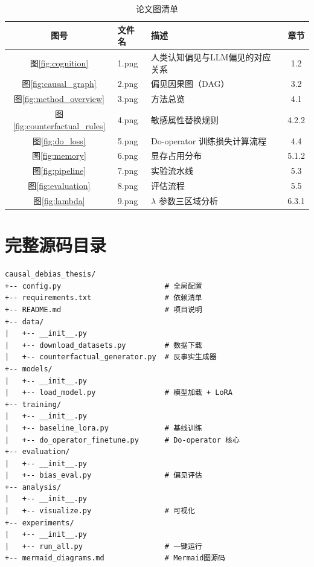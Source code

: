 \documentclass[12pt,a4paper,oneside]{ctexart}
\begin{document}
\begin{table}[H]
  \centering
  \caption{论文图清单}
  \label{tab:figures}
  \begin{tabular}{cllc}
    \toprule
    \textbf{图号} & \textbf{文件名} & \textbf{描述} & \textbf{章节} \\
    \midrule
    图\ref{fig:cognition} & 1.png & 人类认知偏见与LLM偏见的对应关系 & 1.2 \\
    图\ref{fig:causal_graph} & 2.png & 偏见因果图（DAG） & 3.2 \\
    图\ref{fig:method_overview} & 3.png & 方法总览 & 4.1 \\
    图\ref{fig:counterfactual_rules} & 4.png & 敏感属性替换规则 & 4.2.2 \\
    图\ref{fig:do_loss} & 5.png & Do-operator 训练损失计算流程 & 4.4 \\
    图\ref{fig:memory} & 6.png & 显存占用分布 & 5.1.2 \\
    图\ref{fig:pipeline} & 7.png & 实验流水线 & 5.3 \\
    图\ref{fig:evaluation} & 8.png & 评估流程 & 5.5 \\
    图\ref{fig:lambda} & 9.png & $\lambda$ 参数三区域分析 & 6.3.1 \\
    \bottomrule
  \end{tabular}
\end{table}

\section{完整源码目录}

\begin{lstlisting}
causal_debias_thesis/
+-- config.py                        # 全局配置
+-- requirements.txt                 # 依赖清单
+-- README.md                        # 项目说明
+-- data/
|   +-- __init__.py
|   +-- download_datasets.py         # 数据下载
|   +-- counterfactual_generator.py  # 反事实生成器
+-- models/
|   +-- __init__.py
|   +-- load_model.py                # 模型加载 + LoRA
+-- training/
|   +-- __init__.py
|   +-- baseline_lora.py             # 基线训练
|   +-- do_operator_finetune.py      # Do-operator 核心
+-- evaluation/
|   +-- __init__.py
|   +-- bias_eval.py                 # 偏见评估
+-- analysis/
|   +-- __init__.py
|   +-- visualize.py                 # 可视化
+-- experiments/
|   +-- __init__.py
|   +-- run_all.py                   # 一键运行
+-- mermaid_diagrams.md              # Mermaid图源码
\end{lstlisting}
\end{document}
